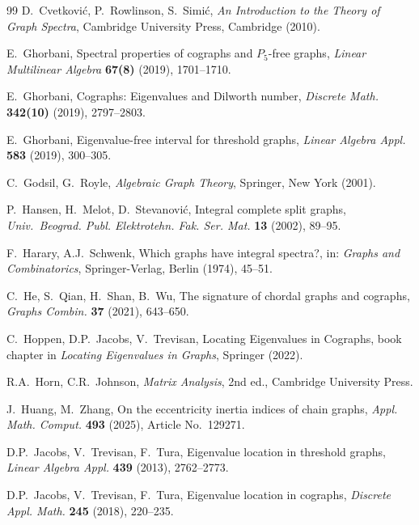 \documentclass[11pt]{article}
\theoremstyle{plain}
\theoremstyle{definition}
\theoremstyle{remark}
\begin{document}
\begin{thebibliography}{99}
		 D.~Cvetkovi\'c, P.~Rowlinson, S.~Simi\'c, \emph{An Introduction to the Theory of Graph Spectra}, Cambridge University Press, Cambridge (2010).
		
		 E.~Ghorbani, Spectral properties of cographs and $P_5$-free graphs, \emph{Linear Multilinear Algebra} \textbf{67(8)} (2019), 1701--1710.
		
		E.~Ghorbani, Cographs: Eigenvalues and Dilworth number, \emph{Discrete Math.} \textbf{342(10)} (2019), 2797--2803.
		
		 E.~Ghorbani, Eigenvalue-free interval for threshold graphs, \emph{Linear Algebra Appl.} \textbf{583} (2019), 300--305.
		
		 C.~Godsil, G.~Royle, \emph{Algebraic Graph Theory}, Springer, New York (2001).
		
		 P.~Hansen, H.~Melot, D.~Stevanovi\'c, Integral complete split graphs, \emph{Univ.\ Beograd. Publ. Elektrotehn. Fak. Ser. Mat.} \textbf{13} (2002), 89--95.
		
		 F.~Harary, A.J.~Schwenk, Which graphs have integral spectra?, in: \emph{Graphs and Combinatorics}, Springer-Verlag, Berlin (1974), 45--51.
		
		 C.~He, S.~Qian, H.~Shan, B.~Wu, The signature of chordal graphs and cographs, \emph{Graphs Combin.} \textbf{37} (2021), 643--650.
		
		 C.~Hoppen, D.P.~Jacobs, V.~Trevisan, Locating Eigenvalues in Cographs, book chapter in \emph{Locating Eigenvalues in Graphs}, Springer (2022).
		
		 R.A.~Horn, C.R.~Johnson, \emph{Matrix Analysis}, 2nd ed., Cambridge University Press.
		
		 J.~Huang, M.~Zhang, On the eccentricity inertia indices of chain graphs, \emph{Appl. Math. Comput.} \textbf{493} (2025), Article No.\ 129271.
		
		 D.P.~Jacobs, V.~Trevisan, F.~Tura, Eigenvalue location in threshold graphs, \emph{Linear Algebra Appl.} \textbf{439} (2013), 2762--2773.
		
		 D.P.~Jacobs, V.~Trevisan, F.~Tura, Eigenvalue location in cographs, \emph{Discrete Appl. Math.} \textbf{245} (2018), 220--235.
		

\end{thebibliography}
\end{document}

